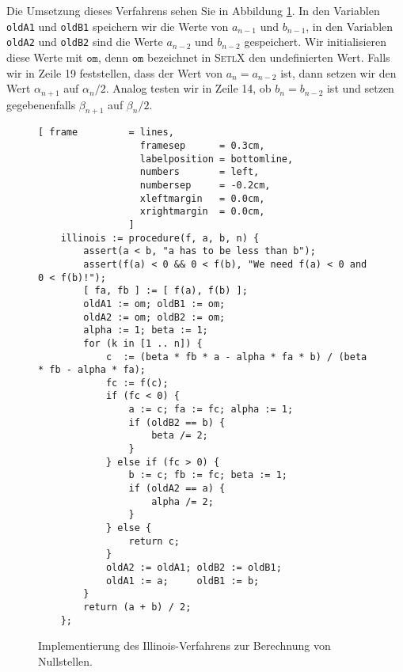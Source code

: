 Die Umsetzung dieses Verfahrens sehen Sie in Abbildung \ref{fig:illinois.stlx}.  In den Variablen
\texttt{oldA1} und \texttt{oldB1} speichern wir die Werte von $a_{n-1}$ und $b_{n-1}$, in den
Variablen \texttt{oldA2} und \texttt{oldB2} sind die Werte $a_{n-2}$ und $b_{n-2}$ gespeichert.  Wir
initialisieren diese Werte mit $\mathtt{om}$, denn $\mathtt{om}$ bezeichnet in \textsc{SetlX}
den undefinierten Wert.
Falls wir in Zeile 19 feststellen, dass der Wert von $a_n = a_{n-2}$ ist, dann setzen wir den Wert
$\alpha_{n+1}$ auf $\alpha_n/2$.  Analog testen wir in Zeile 14, ob $b_n = b_{n-2}$ ist und setzen
gegebenenfalls $\beta_{n+1}$ auf $\beta_n/2$.



\begin{figure}[!ht]
  \centering
\begin{Verbatim}[ frame         = lines, 
                  framesep      = 0.3cm, 
                  labelposition = bottomline,
                  numbers       = left,
                  numbersep     = -0.2cm,
                  xleftmargin   = 0.0cm,
                  xrightmargin  = 0.0cm,
                ]
    illinois := procedure(f, a, b, n) {
        assert(a < b, "a has to be less than b");
        assert(f(a) < 0 && 0 < f(b), "We need f(a) < 0 and 0 < f(b)!");
        [ fa, fb ] := [ f(a), f(b) ];
        oldA1 := om; oldB1 := om;
        oldA2 := om; oldB2 := om;
        alpha := 1; beta := 1;
        for (k in [1 .. n]) {
            c  := (beta * fb * a - alpha * fa * b) / (beta * fb - alpha * fa);
            fc := f(c);
            if (fc < 0) {
                a := c; fa := fc; alpha := 1;
                if (oldB2 == b) {
                    beta /= 2;
                }
            } else if (fc > 0) {
                b := c; fb := fc; beta := 1;
                if (oldA2 == a) {
                    alpha /= 2;
                }
            } else {
                return c;
            }
            oldA2 := oldA1; oldB2 := oldB1;
            oldA1 := a;     oldB1 := b;
        }
        return (a + b) / 2;
    };
\end{Verbatim}
\vspace*{-0.3cm}
  \caption{Implementierung des Illinois-Verfahrens zur Berechnung von Nullstellen.}
  \label{fig:illinois.stlx}
\end{figure} 

